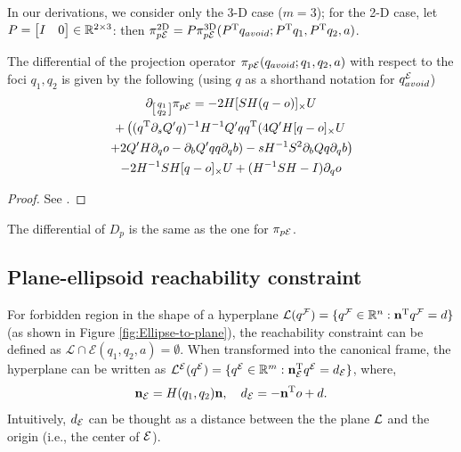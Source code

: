 \documentclass[10pt,twocolumn,twoside]{IEEEtran}
\begin{document}
  In our derivations, we consider only the 3-D case ($m=3$); for the 2-D case, let $P=\begin{bmatrix}I & 0\end{bmatrix}\in\mathbb{R}^{2\times 3}{}$: then $\pi_{p\mathcal{E}}^{\textrm{2D}}=P\pi_{p\mathcal{E}}^{\textrm{3D}}(P^\mathrm{T} q_{avoid}; P^\mathrm{T} q_1, P^\mathrm{T} q_2,a)$.

  \begin{proposition}\label{prop:Ellipse2PointDiff}
    The differential of the projection operator $\pi_{p\mathcal{E}}(q_{avoid}; q_1,q_2,a)$ with respect to the foci $q_1,q_2$ is given by the following (using $q$ as a shorthand notation for $q^{\mathcal{E}}_{avoid}$)
    \begin{multline}
      \partial_{\left[\begin{smallmatrix}q_1\\q_2\end{smallmatrix}\right]} \pi_{p\mathcal{E}}=-2 H [ SH(q-o)]_{\times}U   \\
      + \left( (q^\mathrm{T} \partial_sQ' q)^{-1} H^{-1} Q' q q^\mathrm{T}  (4Q' H[q - o]_\times U \right. \\
      \left.+ 2Q' H\partial_q o - \partial_b Q' q q \partial_q b) -  s H^{-1} S^2 \partial_b Q q \partial_q b\right) \\
      -2H^{-1} S H[q-o]_{\times} U  + (H^{-1}SH -I)\partial_q o
    \end{multline}
  \end{proposition}
  \begin{proof}
  See .
  \end{proof}
  The differential of $D_p$ is the same as the one for $\pi_{p\mathcal{E}}$.

\subsection{Plane-ellipsoid reachability constraint}\label{sec:ellipsoide-plane}

For forbidden region in the shape of a hyperplane $\mathcal{L}({q^{\mathcal{F}}}) = \{{q^{\mathcal{F}}}\in\mathbb{R}^n: \mathbf{n}^\mathrm{T} {q^{\mathcal{F}}} = d\}$ (as shown in Figure \ref{fig:Ellipse-to-plane}), the reachability constraint can be defined as $\mathcal{L} \cap \mathcal{E}(q_1,q_2,a) = \emptyset$. When transformed into the canonical frame, the hyperplane can be written as ${\mathcal{L}^{\mathcal{E}}}({q^{\mathcal{E}}}) = \{  {q^{\mathcal{E}}}\in\mathbb{R}^m:  \mathbf{n}_{\mathcal{E}}^\mathrm{T} {q^{\mathcal{E}}} = d_{\mathcal{E}}\}$, where,
  \begin{equation}
    \mathbf{n}_{\mathcal{E}} = H(q_1,q_2)\mathbf{n}, \quad d_{\mathcal{E}} =-\mathbf{n}^\mathrm{T} o + d.
\end{equation}
Intuitively, $d_{\mathcal{E}}$ can be thought as a distance between the the plane $\mathcal{L}$ and the origin (i.e., the center of $\mathcal{E}$).
\end{document}
